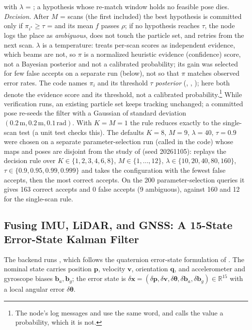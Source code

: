 with $\lambda$ = ; a hypothesis whose re-match window holds no feasible pose dies. \emph{Decision.} After $M$ =  scans (the first included) the best hypothesis is committed only if $\pi_{i^\star}\ge\tau$ =  and its mean $f$ passes $\rho$; if no hypothesis reaches $\tau$, the node logs the place as \emph{ambiguous}, does not touch the particle set, and retries from the next scan. $\lambda$ is a temperature:  treats per-scan scores as independent evidence, which beams are not, so $\pi$ is a normalized heuristic evidence (confidence) score, not a Bayesian posterior and not a calibrated probability; its gain was selected for few false accepts on a separate run (below), not so that $\pi$ matches observed error rates. The code names $\pi_i$ and its threshold $\tau$ \emph{posterior} (, , ); here both denote the evidence score and its threshold, not a calibrated probability.\footnote{The node's log messages and  use the same word, and  calls the value a probability, which it is not.} While verification runs, an existing particle set keeps tracking unchanged; a committed pose re-seeds the filter with a Gaussian of standard deviation $(0.2\,\mathrm{m},0.2\,\mathrm{m},0.1\,\mathrm{rad})$. With $K=M=1$ the rule reduces exactly to the single-scan test (a unit test checks this). The defaults $K=8$, $M=9$, $\lambda=40$, $\tau=0.9$ were chosen on a separate parameter-selection run (called  in the code) whose maps and poses are disjoint from the study of  (seed 20261105):  replays the decision rule over $K\in\{1,2,3,4,6,8\}$, $M\in\{1,\dots,12\}$, $\lambda\in\{10,20,40,80,160\}$, $\tau\in\{0.9,0.95,0.99,0.999\}$ and takes the configuration with the fewest false accepts, then the most correct accepts. On the 200 parameter-selection queries it gives 163 correct accepts and 0 false accepts (9 ambiguous), against 160 and 12 for the single-scan rule.

\subsection{Fusing IMU, LiDAR, and GNSS: A 15-State Error-State Kalman Filter}\label{sec:eskf}

The  backend runs , which follows the quaternion error-state formulation of \citet{sola2017quaternion}. The nominal state carries position $\mathbf{p}$, velocity $\mathbf{v}$, orientation $\mathbf{q}$, and accelerometer and gyroscope biases $\mathbf{b}_a,\mathbf{b}_g$; the error state is $\delta\mathbf{x}=(\delta\mathbf{p},\delta\mathbf{v},\delta\boldsymbol{\theta},\delta\mathbf{b}_a,\delta\mathbf{b}_g)\in\mathbb{R}^{15}$ with a local angular error $\delta\boldsymbol{\theta}$.

